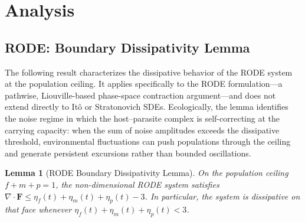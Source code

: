 \documentclass[12pt]{article}
\newtheorem{lemma}{Lemma}
\begin{document}
\section{Analysis}
\subsection{RODE: Boundary Dissipativity Lemma}

The following result characterizes the dissipative behavior of the RODE system at the population ceiling.
It applies specifically to the RODE formulation---a pathwise,
Liouville-based phase-space contraction argument---and does not
extend directly to It\^{o} or Stratonovich SDEs.  Ecologically,
the lemma identifies the noise regime in which the host--parasite
complex is self-correcting at the carrying capacity: when the sum
of noise amplitudes exceeds the dissipative threshold, environmental
fluctuations can push populations through the ceiling and generate
persistent excursions rather than bounded oscillations.

\begin{lemma}[RODE Boundary Dissipativity Lemma]\label{lem:DissipativePoecilia}
On the population ceiling $f+m+p=1$, the non-dimensional RODE system satisfies
$\nabla\cdot\mathbf{F} \le \eta_f(t)+\eta_m(t)+\eta_p(t)-3$.
In particular, the system is dissipative on that face whenever
$\eta_f(t)+\eta_m(t)+\eta_p(t)<3$.
\end{lemma}
\end{document}
